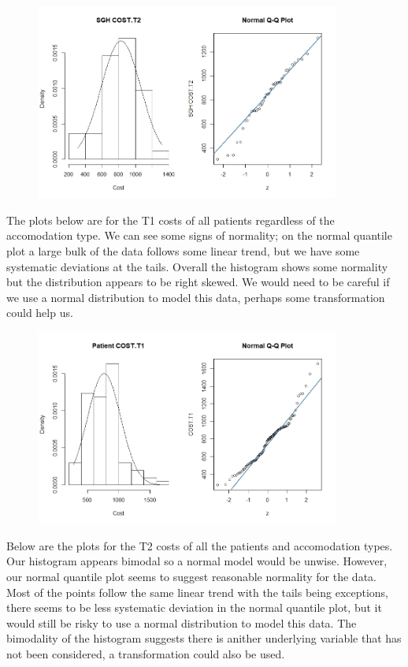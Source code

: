 \documentclass[]{article}
\begin{document}
\begin{figure}[H]
\centering
\includegraphics[width=10cm]{RStudio/jpeg/Norm_SGH_T2.jpeg}
\end{figure}
The plots below are for the T1 costs of all patients regardless of the accomodation type. We can see some signs of normality; on the normal quantile plot a large bulk of the data follows some linear trend, but we have some systematic deviations at the tails. Overall the histogram shows some normality but the distribution appears to be right skewed. We would need to be careful if we use a normal distribution to model this data, perhaps some transformation could help us.
\begin{figure}[H]
\centering
\includegraphics[width=10cm]{RStudio/jpeg/Norm_T1.jpeg}
\end{figure}
Below are the plots for the T2 costs of all the patients and accomodation types. Our histogram appears bimodal so a normal model would be unwise. However, our normal quantile plot seems to suggest reasonable normality for the data. Most of the points follow the same linear trend with the tails being exceptions, there seems to be less systematic deviation in the normal quantile plot, but it would still be risky to use a normal distribution to model this data. The bimodality of the histogram suggests there is anither underlying variable that has not been considered, a transformation could also be used.
\end{document}
